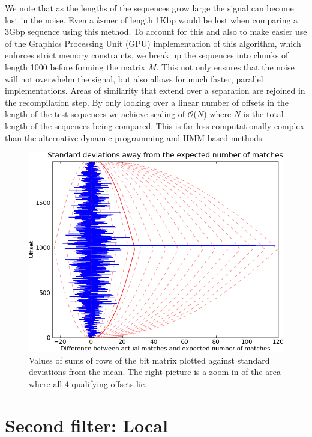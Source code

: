 \documentclass[phd,tocprelim]{cornell}
\begin{document}
We note that as the lengths of the sequences grow large the signal can become lost in the noise. Even a $k$-mer of length 1Kbp would be lost when comparing a 3Gbp sequence using this method. To account for this and also to make easier use of the Graphics Processing Unit (GPU) implementation of this algorithm, which enforces strict memory constraints, we break up the sequences into chunks of length 1000 before forming the matrix $M$. This not only ensures that the noise will not overwhelm the signal, but also allows for much faster, parallel implementations. Areas of similarity that extend over a separation are rejoined in the recompilation step. By only looking over a linear number of offsets in the length of the test sequences we achieve scaling of
$\mathcal O$($N$) where $N$ is the total length of the sequences
being compared. This is far less computationally complex than the alternative dynamic programming and HMM based methods.

 \begin{figure}[htp]%
 \centerline{\includegraphics[width=\textwidth]{figures/velvetrope/globalFilterDuo.png}}
 \caption[First Velvetrope filter]{Values of sums of rows of the bit matrix plotted against standard deviations from the mean. The right picture is a zoom in of the area where all 4 qualifying offsets lie.}
 	\label{fig:vr01}
 \end{figure}

\section{Second filter: Local}
\end{document}
